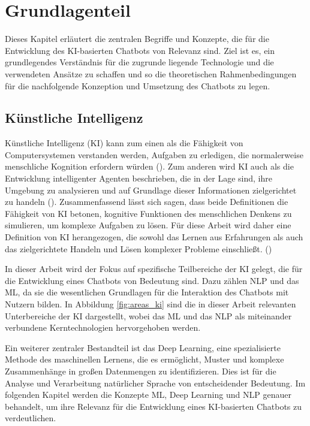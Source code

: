 \chapter{Grundlagenteil}
\label{grundlagen}

Dieses Kapitel erläutert die zentralen Begriffe und Konzepte, die für die Entwicklung des \ac{KI}-basierten Chatbots von Relevanz sind. 
Ziel ist es, ein grundlegendes Verständnis für die zugrunde liegende Technologie und die verwendeten Ansätze zu schaffen und so die theoretischen Rahmenbedingungen für die nachfolgende Konzeption und Umsetzung des Chatbots zu legen.

\section{Künstliche Intelligenz}

Künstliche Intelligenz (\ac{KI}) kann zum einen als die Fähigkeit von Computersystemen verstanden werden, Aufgaben zu erledigen, die normalerweise menschliche Kognition erfordern würden (\cite[S. 406]{Sarferaz2023}). 
Zum anderen wird \ac{KI} auch als die Entwicklung intelligenter Agenten beschrieben, die in der Lage sind, ihre Umgebung zu analysieren und auf Grundlage dieser Informationen zielgerichtet zu handeln (\cite[S. 183]{Coleman2021}).
Zusammenfassend lässt sich sagen, dass beide Definitionen die Fähigkeit von \ac{KI} betonen, kognitive Funktionen des menschlichen Denkens zu simulieren, um komplexe Aufgaben zu lösen. 
Für diese Arbeit wird daher eine Definition von \ac{KI} herangezogen, die sowohl das Lernen aus Erfahrungen als auch das zielgerichtete Handeln und Lösen komplexer Probleme einschließt. (\cite[S. 183]{Coleman2021})

In dieser Arbeit wird der Fokus auf spezifische Teilbereiche der \ac{KI} gelegt, die für die Entwicklung eines Chatbots von Bedeutung sind. Dazu zählen \ac{NLP} und das \ac{ML}, 
da sie die wesentlichen Grundlagen für die Interaktion des Chatbots mit Nutzern bilden. In Abbildung \ref{fig:areas_ki} sind die in dieser Arbeit relevanten Unterbereiche der \ac{KI} dargestellt, 
wobei das \ac{ML} und das \ac{NLP} als miteinander verbundene Kerntechnologien hervorgehoben werden.

Ein weiterer zentraler Bestandteil ist das Deep Learning, eine spezialisierte Methode des maschinellen Lernens, die es ermöglicht, Muster und komplexe Zusammenhänge in großen Datenmengen zu identifizieren. 
Dies ist für die Analyse und Verarbeitung natürlicher Sprache von entscheidender Bedeutung. Im folgenden Kapitel werden die Konzepte \ac{ML}, Deep Learning und \ac{NLP} genauer behandelt, um ihre Relevanz für die Entwicklung eines \ac{KI}-basierten Chatbots zu verdeutlichen.

